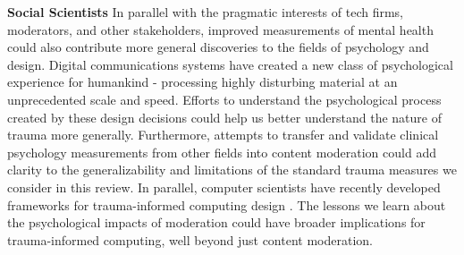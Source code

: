 \textbf{Social Scientists}
In parallel with the pragmatic interests of tech firms, moderators, and other stakeholders, improved measurements of mental health could also contribute more general discoveries to the fields of psychology and design. Digital communications systems have created a new class of psychological experience for humankind - processing highly disturbing material at an unprecedented scale and speed. Efforts to understand the psychological process created by these design decisions could help us better understand the nature of trauma more generally. Furthermore, attempts to transfer and validate clinical psychology measurements from other fields into content moderation could add clarity to the generalizability and limitations of the standard trauma measures we consider in this review. In parallel, computer scientists have recently developed frameworks for trauma-informed computing design \cite{dellet.altraumainformed}. The lessons we learn about the psychological impacts of moderation could have broader implications for trauma-informed computing, well beyond just content moderation.